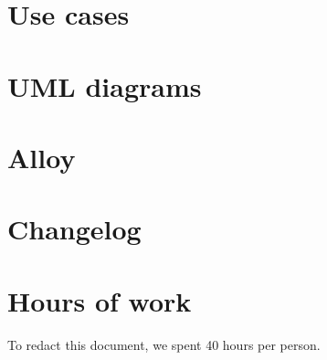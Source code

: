 \begin{appendices}
\chapter{Use cases}


\chapter{UML diagrams}


\chapter{Alloy}


\chapter{Changelog}


\chapter{Hours of work}
To redact this document, we spent 40 hours per person.

\end{appendices}

